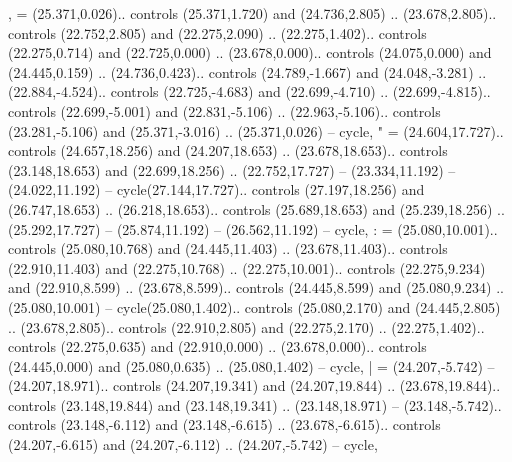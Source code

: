 {,} = {(25.371,0.026).. controls (25.371,1.720) and (24.736,2.805) .. (23.678,2.805).. controls (22.752,2.805) and (22.275,2.090) .. (22.275,1.402).. controls (22.275,0.714) and (22.725,0.000) .. (23.678,0.000).. controls (24.075,0.000) and (24.445,0.159) .. (24.736,0.423).. controls (24.789,-1.667) and (24.048,-3.281) .. (22.884,-4.524).. controls (22.725,-4.683) and (22.699,-4.710) .. (22.699,-4.815).. controls (22.699,-5.001) and (22.831,-5.106) .. (22.963,-5.106).. controls (23.281,-5.106) and (25.371,-3.016) .. (25.371,0.026) -- cycle},
{"} = {(24.604,17.727).. controls (24.657,18.256) and (24.207,18.653) .. (23.678,18.653).. controls (23.148,18.653) and (22.699,18.256) .. (22.752,17.727) -- (23.334,11.192) -- (24.022,11.192) -- cycle(27.144,17.727).. controls (27.197,18.256) and (26.747,18.653) .. (26.218,18.653).. controls (25.689,18.653) and (25.239,18.256) .. (25.292,17.727) -- (25.874,11.192) -- (26.562,11.192) -- cycle},
{:} = {(25.080,10.001).. controls (25.080,10.768) and (24.445,11.403) .. (23.678,11.403).. controls (22.910,11.403) and (22.275,10.768) .. (22.275,10.001).. controls (22.275,9.234) and (22.910,8.599) .. (23.678,8.599).. controls (24.445,8.599) and (25.080,9.234) .. (25.080,10.001) -- cycle(25.080,1.402).. controls (25.080,2.170) and (24.445,2.805) .. (23.678,2.805).. controls (22.910,2.805) and (22.275,2.170) .. (22.275,1.402).. controls (22.275,0.635) and (22.910,0.000) .. (23.678,0.000).. controls (24.445,0.000) and (25.080,0.635) .. (25.080,1.402) -- cycle},
{|} = {(24.207,-5.742) -- (24.207,18.971).. controls (24.207,19.341) and (24.207,19.844) .. (23.678,19.844).. controls (23.148,19.844) and (23.148,19.341) .. (23.148,18.971) -- (23.148,-5.742).. controls (23.148,-6.112) and (23.148,-6.615) .. (23.678,-6.615).. controls (24.207,-6.615) and (24.207,-6.112) .. (24.207,-5.742) -- cycle},
